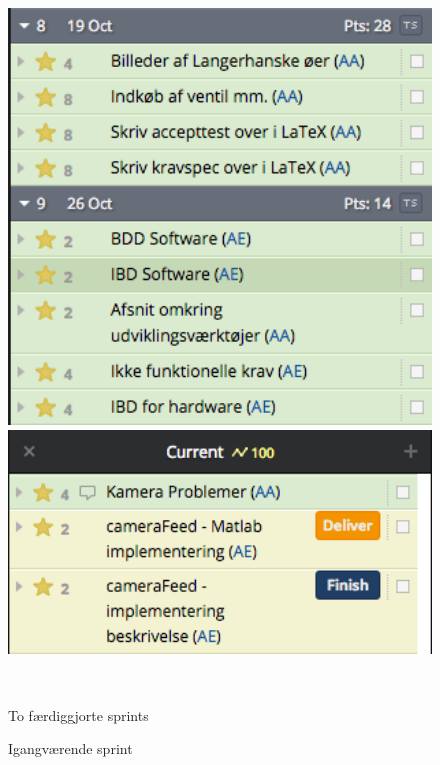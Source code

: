\begin{figure}[htbp] \centering
\begin{minipage}[b]{0.48\textwidth} \centering
\includegraphics[width=1.00\textwidth]{billeder/pt_previous_sprints} %
\end{minipage} \hfill
\begin{minipage}[b]{0.48\textwidth} \centering
\includegraphics[width=1.00\textwidth]{billeder/pt_current_sprint} %
\end{minipage} \\ %
\begin{minipage}[t]{0.48\textwidth}
\caption{To færdiggjorte sprints} %
\label{fig:pt_sprints}
\end{minipage} \hfill
\begin{minipage}[t]{0.48\textwidth}
\caption{Igangværende sprint} %
\label{fig:pt_currentsprint}
\end{minipage}
\end{figure}

